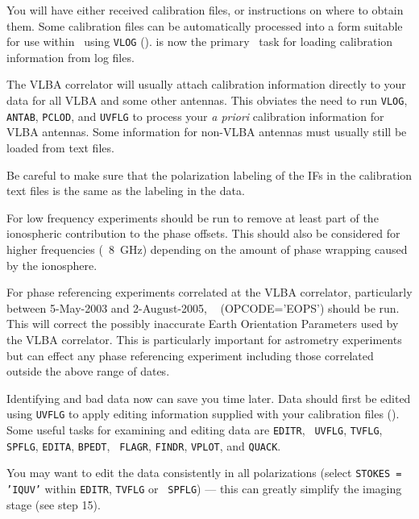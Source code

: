 You will have either received calibration files, or instructions on
where to obtain them.  Some calibration files can be automatically
processed into a form suitable for use within \AIPS\ using {\tt VLOG}
().  {\tt {}} is now the primary \AIPS\ task
for loading calibration information from log files.

The VLBA correlator will usually attach
calibration information directly to your data for all VLBA and some
other antennas.  This obviates the need to run {\tt VLOG}, {\tt
ANTAB}, {\tt PCLOD}, and {\tt UVFLG} to process your {\it a priori\/}
calibration information for VLBA antennas.  Some information for
non-VLBA antennas must usually still be loaded from text files.

Be careful to make sure that the polarization labeling of the IFs in
the calibration text files is the same as the labeling in the data.

For low frequency experiments {\tt {}} should be run to
remove at least part of the ionospheric contribution to the phase
offsets.  This should also be considered for higher frequencies
(\eg\ 8~GHz) depending on the amount of phase wrapping caused by the
ionosphere.

For phase referencing experiments correlated at the VLBA correlator,
particularly between 5-May-2003 and 2-August-2005, {\tt
{}} (OPCODE='EOPS') should be run.  This will correct the
possibly inaccurate Earth Orientation Parameters used by the VLBA
correlator.  This is particularly important for astrometry experiments
but can effect any phase referencing experiment including those
correlated outside the above range of dates.

Identifying and  bad data now can save you time later.
Data should first be edited using {\tt UVFLG} to apply editing
information supplied with your calibration files ().
Some useful tasks for examining and editing data are {\tt EDITR}, {\tt
UVFLG}, {\tt TVFLG}, {\tt SPFLG}, {\tt EDITA}, {\tt BPEDT}, {\tt
FLAGR}, {\tt FINDR}, {\tt VPLOT}, and {\tt QUACK}\@.

You may want to edit the data consistently in all polarizations
(select {\tt STOKES = 'IQUV'} within {\tt EDITR}, {\tt TVFLG} or {\tt
SPFLG}) --- this can greatly simplify the imaging stage (see step 15).


